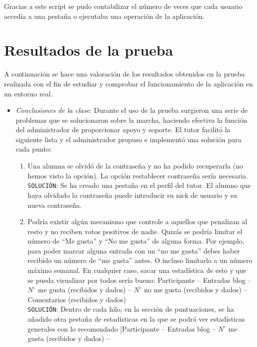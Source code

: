 \documentclass[a4paper, 12pt]{book}
\begin{document}
Gracias a este script se pudo contabilizar el n\'umero de veces que cada usuario acced\'ia a una pesta\~na o ejecutaba una operaci\'on de la aplicaci\'on.


\section{Resultados de la prueba}
\label{seccion:preparacionprueba}
A continuaci\'on se hace una valoraci\'on de los resultados obtenidos en la prueba realizada con el fin de estudiar y comprobar el funcionamiento de la 
aplicaci\'on en un entorno real.

\begin{itemize}
	\item \textit{Conclusiones de la clase}: Durante el uso de la prueba surgieron una serie de problemas que se solucionaron sobre la marcha, haciendo 
	efectiva la funci\'on del administrador de proporcionar apoyo y soporte. El tutor facilit\'o la siguiente lista y el administrador propuso e 
	implement\'o una soluci\'on para cada punto:
	\begin{enumerate}
		\item Una alumna se olvid\'o de la contrase\~na y no ha podido recuperarla (no hemos visto la opci\'on). La opci\'on restablecer 
		contrase\~na ser\'ia necesaria.\\
		\texttt{SOLUCI\'ON}: Se ha creado una pesta\~na en el perfil del tutor. El alumno que haya olvidado la contrase\~na puede introducir 
		su nick de usuario y su nueva contrase\~na.
		\item Podr\'ia existir alg\'un mecanismo que controle a aquellos que penalizan al resto y no reciben votos positivos de nadie. Quiz\'as 
		se podr\'ia limitar el n\'umero de ``Me gusta'' y ``No me gusta'' de alguna forma. Por ejemplo, para poder marcar alguna entrada con un 
		``no me gusta'' debes haber recibido un n\'umero de ``me gusta'' antes. O incluso limitarlo a un n\'umero m\'aximo semanal. En cualquier 
		caso, sacar una estad\'istica de esto y que se pueda visualizar por todos ser\'ia bueno: 
		Participante  --  Entradas blog -- $N^\circ$ me gusta (recibidos y dados) -- $N^\circ$ no me gusta (recibidos y dados) -- Comentarios 
		(recibidos y dados)\\
		\texttt{SOLUCI\'ON}: Dentro de cada hilo, en la secci\'on de puntuaciones, se ha a\~nadido otra pesta\~na de estad\'isticas en la que se 
		podr\'a ver estad\'isticas generales con lo recomendado [Participante  --  Entradas blog -- $N^\circ$ me gusta (recibidos y dados) -- 

\end{enumerate}
\end{itemize}
\end{document}
